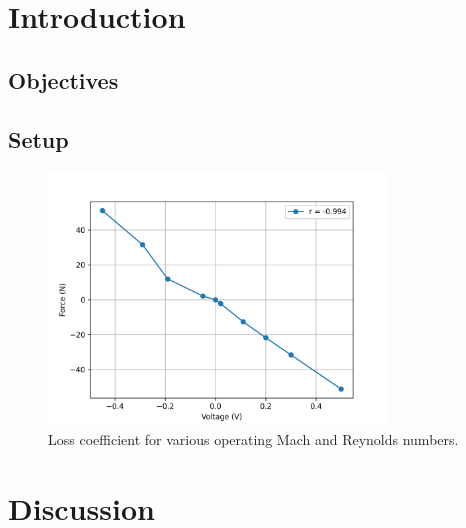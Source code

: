 \documentclass{article}
\begin{document}
\title{}
\author{lwp26}
\date{November 2024}
\maketitle 

\section{Introduction}

\subsection{Objectives}

\subsection{Setup}

\begin{figure}[H]
    \centering
    \includegraphics[width=0.8\textwidth]{Calibration/linearity.png}
    \caption{Loss coefficient for various operating Mach and Reynolds numbers.}
    \label{fig:force_linearity}
\end{figure}

\section{Discussion}
\end{document}
